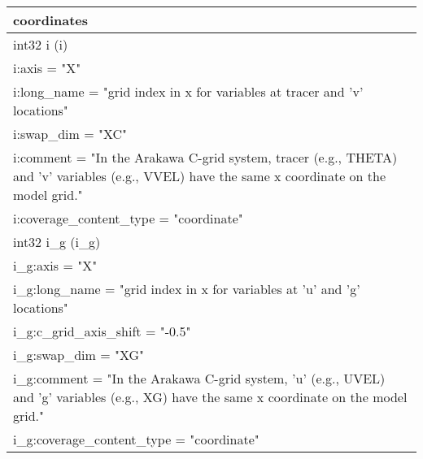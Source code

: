 \begin{longtable}{|p{\textwidth}|}
coordinates\\
\hline
\rowcolor{Apricot}\hspace{0.5cm}int32 i (i)\\
\rowcolor{Apricot}\hspace{0.5cm}\hspace{0.5cm}i:axis = "X"\\
\rowcolor{Apricot}\hspace{0.5cm}\hspace{0.5cm}i:long\_name = "grid index in x for variables at tracer and 'v' locations"\\
\rowcolor{Apricot}\hspace{0.5cm}\hspace{0.5cm}i:swap\_dim = "XC"\\
\rowcolor{Apricot}\hspace{0.5cm}\hspace{0.5cm}i:comment = "In the Arakawa C-grid system, tracer (e.g., THETA) and 'v' variables (e.g., VVEL) have the same x coordinate on the model grid."\\
\rowcolor{Apricot}\hspace{0.5cm}\hspace{0.5cm}i:coverage\_content\_type = "coordinate"\\
\rowcolor{Apricot}\hspace{0.5cm}int32 i\_g (i\_g)\\
\rowcolor{Apricot}\hspace{0.5cm}\hspace{0.5cm}i\_g:axis = "X"\\
\rowcolor{Apricot}\hspace{0.5cm}\hspace{0.5cm}i\_g:long\_name = "grid index in x for variables at 'u' and 'g' locations"\\
\rowcolor{Apricot}\hspace{0.5cm}\hspace{0.5cm}i\_g:c\_grid\_axis\_shift = "-0.5"\\
\rowcolor{Apricot}\hspace{0.5cm}\hspace{0.5cm}i\_g:swap\_dim = "XG"\\
\rowcolor{Apricot}\hspace{0.5cm}\hspace{0.5cm}i\_g:comment = "In the Arakawa C-grid system, 'u' (e.g., UVEL) and 'g' variables (e.g., XG) have the same x coordinate on the model grid."\\
\rowcolor{Apricot}\hspace{0.5cm}\hspace{0.5cm}i\_g:coverage\_content\_type = "coordinate"\\

\end{longtable}
